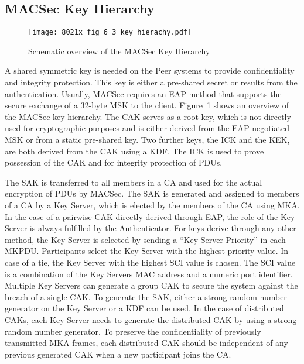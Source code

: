 \subsection{MACSec Key Hierarchy}
\begin{figure}[ht]
    \centering
    \texttt{[image: 8021x\_fig\_6\_3\_key\_hierachy.pdf]}
    \caption{Schematic overview of the MACSec Key Hierarchy\cite{IEEE8021X}}\label{fig:8021x_fig_6_3_overview}
\end{figure}

A shared symmetric key is needed on the Peer systems to provide confidentiality and integrity protection. This key is either a pre-shared secret or results from the authentication. Usually, MACSec requires an EAP method that supports the secure exchange of a 32-byte \ac{MSK} to the client. Figure~\ref{fig:8021x_fig_6_3_overview} shows an overview of the MACSec key hierarchy. The \ac{CAK} serves as a root key, which is not directly used for cryptographic purposes and is either derived from the EAP negotiated \ac{MSK} or from a static pre-shared key. Two further keys, the \ac{ICK} and the \ac{KEK}, are both derived from the \ac{CAK} using a \ac{KDF}. The \ac{ICK} is used to prove possession of the \ac{CAK} and for integrity protection of \acp{PDU}.

The \ac{SAK} is transferred to all members in a \ac{CA} and used for the actual encryption of \acp{PDU} by MACSec. The \ac{SAK} is generated and assigned to members of a \ac{CA} by a Key Server, which is elected by the members of the \ac{CA} using \ac{MKA}. In the case of a pairwise \ac{CAK} directly derived through \ac{EAP}, the role of the Key Server is always fulfilled by the Authenticator. For keys derive through any other method, the Key Server is selected by sending a ``Key Server Priority'' in each MK\ac{PDU}. Participants select the Key Server with the highest priority value. In case of a tie, the Key Server with the highest SCI value is chosen. The SCI value is a combination of the Key Servers MAC address and a numeric port identifier. Multiple Key Servers can generate a group \ac{CAK} to secure the system against the breach of a single \ac{CAK}. To generate the \ac{SAK}, either a strong random number generator on the Key Server or a \ac{KDF} can be used. In the case of distributed \acp{CAK}, each Key Server needs to generate the distributed \ac{CAK} by using a strong random number generator. To preserve the confidentiality of previously transmitted MKA frames, each distributed \ac{CAK} should be independent of any previous generated \ac{CAK} when a new participant joins the \ac{CA}\cite{IEEE8021X}.

